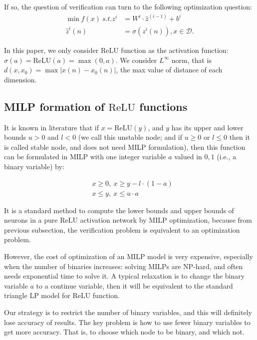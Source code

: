 \documentclass[8pt]{article}
\theoremstyle{definition}
\newcommand{\ReLU}{\mathrm{ReLU}}
\begin{document}
If so, the question of verification can turn to the following optimization question: \begin{align*}
	\min f(x) \ s.t. {z}^{i} &= W^i\cdot \hat{z}^{(i-1)}+ b^i\\
	\hat{z}^{i}(n) &= \sigma({z}^i(n)), x\in\mathcal{D}.
\end{align*}

In this paper, we only consider $\ReLU$ function as the activation function: $\sigma(a)=\ReLU(a)=\max(0,a)$. We consider $L^{\infty}$ norm, that is $d(x,x_0)=\max |x(n)-x_0(n)|$, the max value of distance of each dimension.



\subsection{MILP formation of $\ReLU$ functions}



It is known in literature that if $x=\ReLU(y)$, and $y$ has its upper and lower bounds $u>0$ and $l<0$ (we call this unstable node; and if $u\geq 0$ or $l\leq 0$ then it is called stable node, and does not need MILP formulation), then this function can be formulated in MILP with one integer variable $a$ valued in ${0,1}$ (i.e., a binary variable) by:

\vspace*{-4ex}

\begin{align*}
	&x \geq 0, \ 
	x \geq y-l\cdot (1-a)\\
	&x \leq y,\ 
	x \leq u\cdot a
\end{align*} 

It is a standard method to compute the lower bounds and upper bounds of neurons in a pure $\ReLU$ activation network by MILP optimization, because from previous subsection, the verification problem is equivalent to an optimization problem.

However, the cost of optimization of an MILP model is very expensive, especially when the number of binaries increases: solving MILPs are NP-hard, and often needs exponential time to solve it. A typical relaxation is to change the binary variable $a$ to a continue variable, then it will be equivalent to the standard triangle LP model for $\ReLU$ function.

Our strategy is to restrict the number of binary variables, and this will definitely lose accuracy of results.  The key problem is how to use fewer binary variables to get more accuracy. That is, to choose which node to be binary, and which not.
\end{document}
